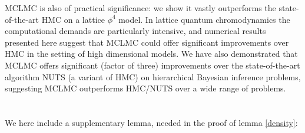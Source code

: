 \documentclass[tablecaption=bottom,wcp]{jmlr} %
\begin{document}
MCLMC is also of 
practical significance: we show
it vastly outperforms the state-of-the-art HMC on 
a lattice $\phi^4$ model. In lattice quantum chromodynamics \citep{LQCDGattringer, LQCDDegrand} the
computational demands are 
particularly intensive, and numerical results presented here 
suggest that MCLMC could offer 
significant improvements over 
HMC in the setting of high dimensional
models. 
We have also demonstrated that MCLMC offers significant (factor of three) improvements over the state-of-the-art algorithm NUTS (a variant of HMC) on hierarchical Bayesian inference problems,
suggesting MCLMC outperforms HMC/NUTS 
over a wide range of problems. 








\appendix


\section{}

We here include a supplementary lemma, needed in the proof of lemma \ref{density}:
\end{document}
